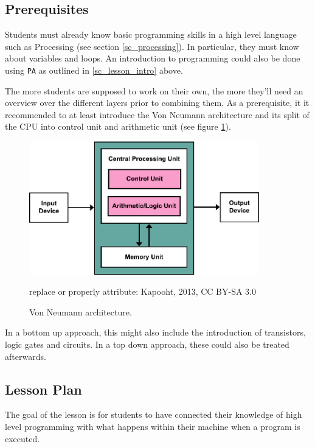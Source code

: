 \subsection{Prerequisites}
Students must already know basic programming skills in a high level language such as Processing (see section \ref{sc_processing}). In particular, they must know about variables and loops. An introduction to programming could also be done using \texttt{PA} as outlined in \ref{sc_lesson_intro} above.

The more students are supposed to work on their own, the more they'll need an overview over the different layers prior to combining them. As a prerequisite, it it recommended to at least introduce the Von Neumann architecture and its split of the CPU into control unit and arithmetic unit (see figure \ref{fig_von_neumann}).

\begin{figure} \label{fig_von_neumann}
\centering
\includegraphics[width=10cm]{images/Von_Neumann_Architecture.pdf}
\lessSpace
\caption{Von Neumann architecture.}
\begin{todo}
\item replace or properly attribute: Kapooht, 2013, CC BY-SA 3.0
\end{todo}
\end{figure}

In a bottom up approach, this might also include the introduction of transistors, logic gates and circuits. In a top down approach, these could also be treated afterwards.


\subsection{Lesson Plan}

The goal of the lesson is for students to have connected their knowledge of high level programming with what happens within their machine when a program is executed.


